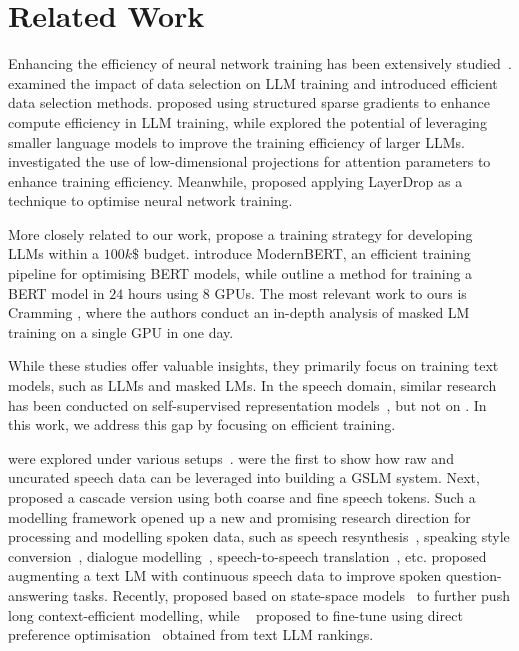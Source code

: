 \section{Related Work}

 Enhancing the efficiency of neural network training has been extensively studied~\citep{shen2023efficient}. \citet{hajimolahoseini2023swiftlearn, wang2024greats} examined the impact of data selection on \ac{LLM} training and introduced efficient data selection methods. \citet{muhamed2024grass} proposed using structured sparse gradients to enhance compute efficiency in \ac{LLM} training, while \citet{rawat2024little} explored the potential of leveraging smaller language models to improve the training efficiency of larger \ac{LLM}s. \citet{lv2024scalable} investigated the use of low-dimensional projections for attention parameters to enhance training efficiency. Meanwhile, \citet{neiterman2024layerdropback} proposed applying LayerDrop as a technique to optimise neural network training.

More closely related to our work, \citet{li2023flm} propose a training strategy for developing \ac{LLM}s within a $100k\$$ budget. \citet{warner2024modernbert} introduce ModernBERT, an efficient training pipeline for optimising BERT models, while \citet{izsak2021train} outline a method for training a BERT model in $24$ hours using $8$ GPUs. The most relevant work to ours is Cramming \cite{geiping2023cramming}, where the authors conduct an in-depth analysis of masked LM training on a single GPU in one day.

While these studies offer valuable insights, they primarily focus on training text models, such as \ac{LLM}s and masked LMs. In the speech domain, similar research has been conducted on self-supervised representation models~\citep{liu2024efficient}, but not on \slms. In this work, we address this gap by focusing on efficient \slm training.

 were explored under various setups~\citep{gslm, kharitonov2021text}.  
\citet{gslm} were the first to show how raw and uncurated speech data can be leveraged into building a \ac{GSLM} system. Next,~\citet{borsos2023audiolm} proposed a cascade version using both coarse and fine speech tokens. Such a modelling framework opened up a new and promising research direction for processing and modelling spoken data, such as speech resynthesis~\citep{polyak2021speech}, speaking style conversion~\citep{kreuk2021textless,maimon2023dissc}, dialogue modelling~\cite{nguyen2022generative}, speech-to-speech translation~\citep{popuri2022enhanced, peng2024mslm}, etc. 
\citet{nachmani2023spoken} proposed augmenting a text \ac{LM} with continuous speech data to improve spoken question-answering tasks. Recently, \citet{park2024long} proposed \slm based on state-space models~\citep{gu2021efficiently} to further push long context-efficient modelling, while ~\citet{lin2024alignslm} proposed to fine-tune \slms using direct preference optimisation~\citep{rafailov2024dpo} obtained from text LLM rankings. 

